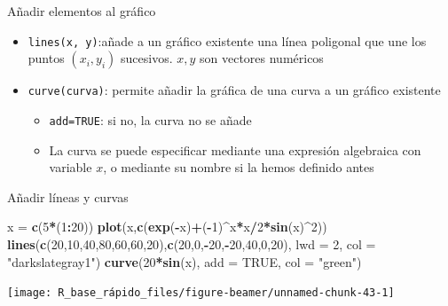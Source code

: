 \documentclass[
  ignorenonframetext,
  aspectratio=169]{beamer}
\newenvironment{Shaded}{\begin{snugshade}}{\end{snugshade}}
\newcommand{\AttributeTok}[1]{\textcolor[rgb]{0.13,0.29,0.53}{#1}}
\newcommand{\ConstantTok}[1]{\textcolor[rgb]{0.56,0.35,0.01}{#1}}
\newcommand{\DecValTok}[1]{\textcolor[rgb]{0.00,0.00,0.81}{#1}}
\newcommand{\FunctionTok}[1]{\textcolor[rgb]{0.13,0.29,0.53}{\textbf{#1}}}
\newcommand{\NormalTok}[1]{#1}
\newcommand{\OtherTok}[1]{\textcolor[rgb]{0.56,0.35,0.01}{#1}}
\newcommand{\SpecialCharTok}[1]{\textcolor[rgb]{0.81,0.36,0.00}{\textbf{#1}}}
\newcommand{\StringTok}[1]{\textcolor[rgb]{0.31,0.60,0.02}{#1}}
\providecommand{\tightlist}{%
  \setlength{\itemsep}{0pt}\setlength{\parskip}{0pt}}
\begin{document}
\begin{frame}[fragile]{Añadir elementos al gráfico}
\label{auxf1adir-elementos-al-gruxe1fico-2}
\begin{itemize}
\tightlist
\item
  \texttt{lines(x,\ y)}:añade a un gráfico existente una línea poligonal
  que une los puntos \((x_i, y_i)\) sucesivos. \(x,y\) son vectores
  numéricos
\item
  \texttt{curve(curva)}: permite añadir la gráfica de una curva a un
  gráfico existente

  \begin{itemize}
  \tightlist
  \item
    \texttt{add=TRUE}: si no, la curva no se añade
  \item
    La curva se puede especificar mediante una expresión algebraica con
    variable \(x\), o mediante su nombre si la hemos definido antes
  \end{itemize}
\end{itemize}
\end{frame}

\begin{frame}[fragile]{Añadir líneas y curvas}
\label{auxf1adir-luxedneas-y-curvas}
\begin{Shaded}
\begin{Highlighting}[]
\NormalTok{x }\OtherTok{=} \FunctionTok{c}\NormalTok{(}\DecValTok{5}\SpecialCharTok{*}\NormalTok{(}\DecValTok{1}\SpecialCharTok{:}\DecValTok{20}\NormalTok{))}
\FunctionTok{plot}\NormalTok{(x,}\FunctionTok{c}\NormalTok{(}\FunctionTok{exp}\NormalTok{(}\SpecialCharTok{{-}}\NormalTok{x)}\SpecialCharTok{+}\NormalTok{(}\SpecialCharTok{{-}}\DecValTok{1}\NormalTok{)}\SpecialCharTok{\^{}}\NormalTok{x}\SpecialCharTok{*}\NormalTok{x}\SpecialCharTok{/}\DecValTok{2}\SpecialCharTok{*}\FunctionTok{sin}\NormalTok{(x)}\SpecialCharTok{\^{}}\DecValTok{2}\NormalTok{))}
\FunctionTok{lines}\NormalTok{(}\FunctionTok{c}\NormalTok{(}\DecValTok{20}\NormalTok{,}\DecValTok{10}\NormalTok{,}\DecValTok{40}\NormalTok{,}\DecValTok{80}\NormalTok{,}\DecValTok{60}\NormalTok{,}\DecValTok{60}\NormalTok{,}\DecValTok{20}\NormalTok{),}\FunctionTok{c}\NormalTok{(}\DecValTok{20}\NormalTok{,}\DecValTok{0}\NormalTok{,}\SpecialCharTok{{-}}\DecValTok{20}\NormalTok{,}\SpecialCharTok{{-}}\DecValTok{20}\NormalTok{,}\DecValTok{40}\NormalTok{,}\DecValTok{0}\NormalTok{,}\DecValTok{20}\NormalTok{), }
      \AttributeTok{lwd =} \DecValTok{2}\NormalTok{, }\AttributeTok{col =} \StringTok{"darkslategray1"}\NormalTok{)}
\FunctionTok{curve}\NormalTok{(}\DecValTok{20}\SpecialCharTok{*}\FunctionTok{sin}\NormalTok{(x), }\AttributeTok{add =} \ConstantTok{TRUE}\NormalTok{, }\AttributeTok{col =} \StringTok{"green"}\NormalTok{)}
\end{Highlighting}
\end{Shaded}

\begin{center}\texttt{[image: R\_base\_rápido\_files/figure-beamer/unnamed-chunk-43-1]} \end{center}
\end{frame}
\end{document}
